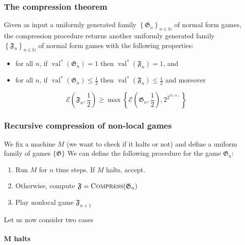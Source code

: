 \subsubsection{The compression theorem}
\begin{theorem}\label{th:compression}
     Given as input a uniformly generated family $\left\{\mathfrak{G}_{n}\right\}_{n \in \mathbb{N}}$ of normal form games, the compression procedure returns another uniformly generated family $\left\{\mathfrak{F}_{n}\right\}_{n \in \mathbb{N}}$ of normal form games with the following properties: 
     \begin{itemize}
     \item for all $n$, if $\operatorname{val}^{*}\left(\mathfrak{G}_{{n}}\right)=1$ then $\operatorname{val}^{*}\left(\mathfrak{F}_{n}\right)=1$, and 
        \item for all $n$, if $\operatorname{val}^{*}\left(\mathfrak{G}_{{n}}\right) \leq \frac{1}{2}$ then $\operatorname{val}^{*}\left(\mathfrak{F}_{n}\right) \leq \frac{1}{2}$ and moreover
     \end{itemize}
    \begin{equation}
    \mathscr{E}\left(\mathfrak{F}_{n}, \frac{1}{2}\right) \geq \max \left\{\mathscr{E}\left(\mathfrak{G}_{{n}}, \frac{1}{2}\right), 2^{2^{\Omega(n)}}\right\}
    \end{equation}
\end{theorem}
\subsubsection{Recursive compression of non-local games}
We fix a machine $M$ (we want to check if it halts or not) and define a uniform family of games $\{\mathfrak{G}\}$
We can define the following procedure for the game $\mathfrak{G}_{n}$:

\begin{enumerate}
\item Run $M$ for $n$ time steps. If $M$ halts, accept.
\item Otherwise, compute $\mathfrak{F} = \textsc{Compress}({\mathfrak{G}_n})$
\item  Play nonlocal game $\mathfrak{F}_{n+1}$
\end{enumerate}

Let us now consider two cases 

\paragraph{M halts}

